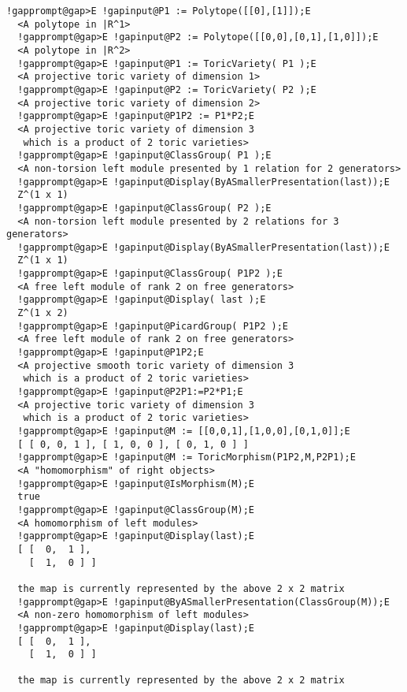 \documentclass[a4paper,11pt]{report}
\begin{document}
{{{\begin{Verbatim}[commandchars=!@E,fontsize=\small,frame=single,label=Example]
  !gapprompt@gap>E !gapinput@P1 := Polytope([[0],[1]]);E
  <A polytope in |R^1>
  !gapprompt@gap>E !gapinput@P2 := Polytope([[0,0],[0,1],[1,0]]);E
  <A polytope in |R^2>
  !gapprompt@gap>E !gapinput@P1 := ToricVariety( P1 );E
  <A projective toric variety of dimension 1>
  !gapprompt@gap>E !gapinput@P2 := ToricVariety( P2 );E
  <A projective toric variety of dimension 2>
  !gapprompt@gap>E !gapinput@P1P2 := P1*P2;E
  <A projective toric variety of dimension 3
   which is a product of 2 toric varieties>
  !gapprompt@gap>E !gapinput@ClassGroup( P1 );E
  <A non-torsion left module presented by 1 relation for 2 generators>
  !gapprompt@gap>E !gapinput@Display(ByASmallerPresentation(last));E
  Z^(1 x 1)
  !gapprompt@gap>E !gapinput@ClassGroup( P2 );E
  <A non-torsion left module presented by 2 relations for 3 generators>
  !gapprompt@gap>E !gapinput@Display(ByASmallerPresentation(last));E
  Z^(1 x 1)
  !gapprompt@gap>E !gapinput@ClassGroup( P1P2 );E
  <A free left module of rank 2 on free generators>
  !gapprompt@gap>E !gapinput@Display( last );E
  Z^(1 x 2)
  !gapprompt@gap>E !gapinput@PicardGroup( P1P2 );E
  <A free left module of rank 2 on free generators>
  !gapprompt@gap>E !gapinput@P1P2;E
  <A projective smooth toric variety of dimension 3 
   which is a product of 2 toric varieties>
  !gapprompt@gap>E !gapinput@P2P1:=P2*P1;E
  <A projective toric variety of dimension 3 
   which is a product of 2 toric varieties>
  !gapprompt@gap>E !gapinput@M := [[0,0,1],[1,0,0],[0,1,0]];E
  [ [ 0, 0, 1 ], [ 1, 0, 0 ], [ 0, 1, 0 ] ]
  !gapprompt@gap>E !gapinput@M := ToricMorphism(P1P2,M,P2P1);E
  <A "homomorphism" of right objects>
  !gapprompt@gap>E !gapinput@IsMorphism(M);E
  true
  !gapprompt@gap>E !gapinput@ClassGroup(M);E
  <A homomorphism of left modules>
  !gapprompt@gap>E !gapinput@Display(last);E
  [ [  0,  1 ],
    [  1,  0 ] ]
  
  the map is currently represented by the above 2 x 2 matrix
  !gapprompt@gap>E !gapinput@ByASmallerPresentation(ClassGroup(M));E
  <A non-zero homomorphism of left modules>
  !gapprompt@gap>E !gapinput@Display(last);E
  [ [  0,  1 ],
    [  1,  0 ] ]
  
  the map is currently represented by the above 2 x 2 matrix
\end{Verbatim}
}

 }

  }

   
\end{document}

